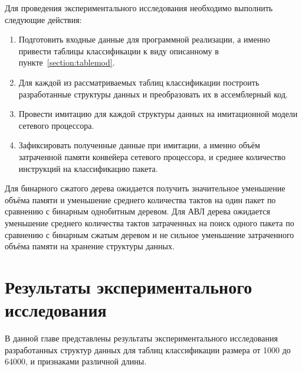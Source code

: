 \documentclass[conference]{IEEEtran}
\begin{document}
            Для проведения экспериментального исследования необходимо выполнить следующие действия:
            \begin{enumerate}
                \item Подготовить входные данные для программной реализации, а именно привести таблицы классификации к виду описанному в пункте~\ref{section:tablemod}.
                \item Для каждой из рассматриваемых таблиц классификации построить разработанные структуры данных и преобразовать их в ассемблерный код.
                \item Провести имитацию для каждой структуры данных на имитационной модели сетевого процессора.
                \item Зафиксировать полученные данные при имитации, а именно объём затраченной памяти конвейера сетевого процессора, и среднее количество инструкций
                    на классификацию пакета.
            \end{enumerate}

            Для бинарного сжатого дерева ожидается получить значительное уменьшение объёма памяти и уменьшение среднего количества тактов на один пакет 
            по сравнению с бинарным однобитным деревом.
            Для АВЛ дерева ожидается уменьшение среднего количества тактов затраченных на поиск одного пакета по сравнению с бинарным сжатым деревом и 
            не сильное уменьшение затраченного объёма памяти на хранение структуры данных.
    \section{Результаты экспериментального исследования}
        В данной главе представлены результаты экспериментального исследования разработанных структур данных для таблиц классификации размера от 1000 до 64000, 
        и признаками различной длины.
\end{document}
